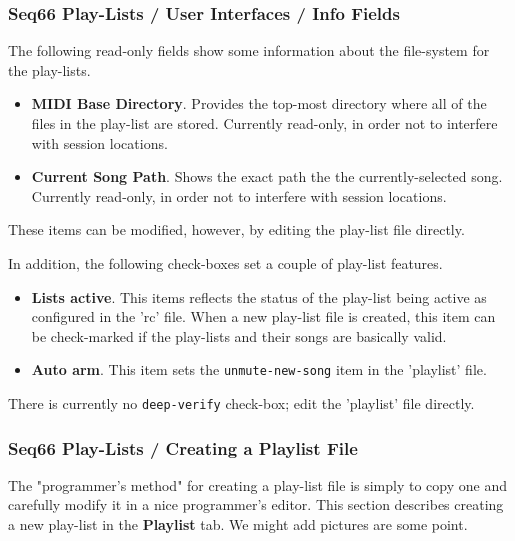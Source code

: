 \subsubsection{Seq66 Play-Lists / User Interfaces / Info Fields}
\label{subsubsec:playlist_ui_info_fields}

   The following read-only fields show some information about the file-system
   for the play-lists.

   \begin{itemize}
      \item \textbf{MIDI Base Directory}.
         Provides the top-most directory where all of the files in the
         play-list are stored.
         Currently read-only, in order not to interfere with session locations.
      \item \textbf{Current Song Path}.
         Shows the exact path the the currently-selected song.
         Currently read-only, in order not to interfere with session locations.
   \end{itemize}

   These items can be modified, however, by editing the play-list file
   directly.

   In addition, the following check-boxes set a couple of play-list features.
   
   \begin{itemize}
      \item \textbf{Lists active}.
         This items reflects the status of the play-list being active as
         configured in the 'rc' file.
         When a new play-list file is created, this item can be check-marked
         if the play-lists and their songs are basically valid.
      \item \textbf{Auto arm}.
         This item sets the \texttt{unmute-new-song} item in the 'playlist'
         file.
   \end{itemize}

   There is currently no \texttt{deep-verify} check-box; edit the 'playlist'
   file directly.

\subsubsection{Seq66 Play-Lists / Creating a Playlist File}
\label{subsubsec:playlist_creating_playlist_file}

   The "programmer's method" for creating a play-list file is simply to copy
   one and carefully modify it in a nice programmer's editor.
   This section describes creating a new play-list in the \textbf{Playlist}
   tab.  We might add pictures are some point.

